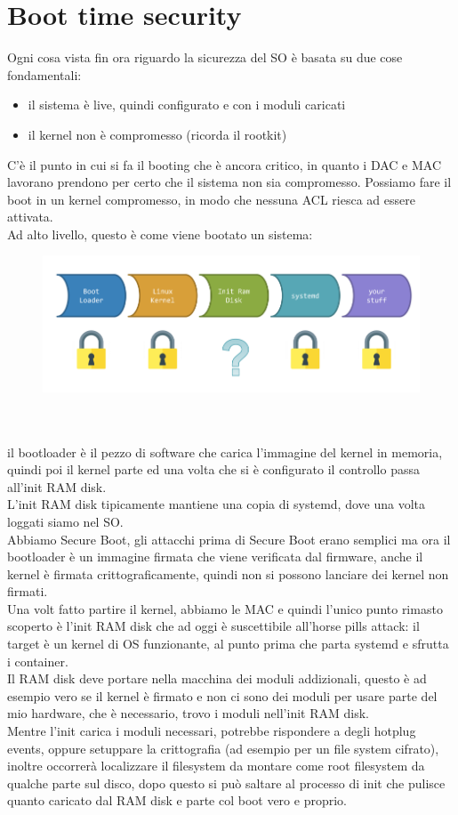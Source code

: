 \documentclass[12pt, oneside]{extbook} %
\begin{document}
\section{Boot time security}
Ogni cosa vista fin ora riguardo la sicurezza del SO è basata su due cose fondamentali:
\begin{itemize}
\item il sistema è live, quindi configurato e con i moduli caricati
\item il kernel non è compromesso (ricorda il rootkit)
\end{itemize}
C'è il punto in cui si fa il booting che è ancora critico, in quanto i DAC e MAC lavorano prendono per certo che il sistema non sia compromesso. Possiamo fare il boot in un kernel compromesso, in modo che nessuna ACL riesca ad essere attivata.\\Ad alto livello, questo è come viene bootato un sistema:\\
\begin{figure}[!h]
	\includegraphics[scale=0.4]{immagini/boot_scheme.png}
\end{figure}\\\\
il bootloader è il pezzo di software che carica l'immagine del kernel in memoria, quindi poi il kernel parte ed una volta che si è configurato il controllo passa all'init RAM disk.\\L'init RAM disk tipicamente mantiene una copia di systemd, dove una volta loggati siamo nel SO.\\Abbiamo Secure Boot, gli attacchi prima di Secure Boot erano semplici ma ora il bootloader è un immagine firmata che viene verificata dal firmware, anche il kernel è firmata crittograficamente, quindi non si possono lanciare dei kernel non firmati.\\Una volt fatto partire il kernel, abbiamo le MAC e quindi l'unico punto rimasto scoperto è l'init RAM disk che ad oggi è suscettibile all'horse pills attack: il target è un kernel di OS funzionante, al punto prima che parta systemd e sfrutta i container.\\ Il RAM disk deve portare nella macchina dei moduli addizionali, questo è ad esempio vero se il kernel è firmato e non ci sono dei moduli per usare parte del mio hardware, che è necessario, trovo i moduli nell'init RAM disk.\\Mentre l'init carica i moduli necessari, potrebbe rispondere a degli hotplug events, oppure setuppare la crittografia (ad esempio per un file system cifrato), inoltre occorrerà localizzare il filesystem da montare come root filesystem da qualche parte sul disco, dopo questo si può saltare al processo di init che pulisce quanto caricato dal RAM disk e parte col boot vero e proprio.
\end{document}
